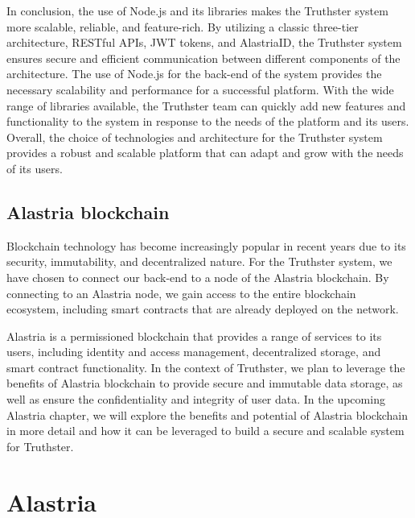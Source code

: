 \documentclass[target=mst,aauheader=]{thud}
\begin{document}
In conclusion, the use of Node.js and its libraries makes the Truthster system more scalable, reliable, and feature-rich. By utilizing a classic three-tier architecture, RESTful APIs, JWT tokens, and AlastriaID, the Truthster system ensures secure and efficient communication between different components of the architecture. The use of Node.js for the back-end of the system provides the necessary scalability and performance for a successful platform. With the wide range of libraries available, the Truthster team can quickly add new features and functionality to the system in response to the needs of the platform and its users. Overall, the choice of technologies and architecture for the Truthster system provides a robust and scalable platform that can adapt and grow with the needs of its users.

\section{Alastria blockchain}

Blockchain technology has become increasingly popular in recent years due to its security, immutability, and decentralized nature. For the Truthster system, we have chosen to connect our back-end to a node of the Alastria blockchain\cite{alastriaBlockchain}. By connecting to an Alastria node, we gain access to the entire blockchain ecosystem, including smart contracts that are already deployed on the network.\par
Alastria is a permissioned blockchain that provides a range of services to its users, including identity and access management, decentralized storage, and smart contract functionality. In the context of Truthster, we plan to leverage the benefits of Alastria blockchain to provide secure and immutable data storage, as well as ensure the confidentiality and integrity of user data. In the upcoming Alastria chapter, we will explore the benefits and potential of Alastria blockchain in more detail and how it can be leveraged to build a secure and scalable system for Truthster.







\chapter{Alastria}
\label{chapter:alastria}
\end{document}
